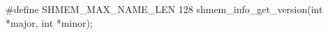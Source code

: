 \synC
#define SHMEM_MAX_NAME_LEN 128
shmem\_info\_get\_version(int *major, int *minor);


\synF



{
	
}
{
		\desR{}
	\notesB{}
}
		
\exampleB{
}
\eAPI

